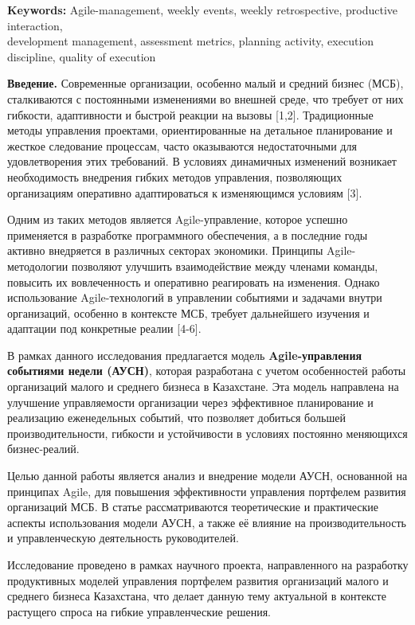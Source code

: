 {\bfseries Keywords:} Agile-management, weekly events, weekly
retrospective, productive interaction, \\development management,
assessment metrics, planning activity, execution discipline, quality of
execution
\begin{multicols}{2}

{\bfseries Введение.} Современные организации, особенно малый и средний
бизнес (МСБ), сталкиваются с постоянными изменениями во внешней среде,
что требует от них гибкости, адаптивности и быстрой реакции на вызовы
{[}1,2{]}. Традиционные методы управления проектами, ориентированные на
детальное планирование и жесткое следование процессам, часто оказываются
недостаточными для удовлетворения этих требований. В условиях динамичных
изменений возникает необходимость внедрения гибких методов управления,
позволяющих организациям оперативно адаптироваться к изменяющимся
условиям {[}3{]}.

Одним из таких методов является Agile-управление, которое успешно
применяется в разработке программного обеспечения, а в последние годы
активно внедряется в различных секторах экономики. Принципы
Agile-методологии позволяют улучшить взаимодействие между членами
команды, повысить их вовлеченность и оперативно реагировать на
изменения. Однако использование Agile-технологий в управлении событиями
и задачами внутри организаций, особенно в контексте МСБ, требует
дальнейшего изучения и адаптации под конкретные реалии {[}4-6{]}.

В рамках данного исследования предлагается модель
{\bfseries Agile-управления событиями недели (АУСН)}, которая разработана с
учетом особенностей работы организаций малого и среднего бизнеса в
Казахстане. Эта модель направлена на улучшение управляемости организации
через эффективное планирование и реализацию еженедельных событий, что
позволяет добиться большей производительности, гибкости и устойчивости в
условиях постоянно меняющихся бизнес-реалий.

Целью данной работы является анализ и внедрение модели АУСН, основанной
на принципах Agile, для повышения эффективности управления портфелем
развития организаций МСБ. В статье рассматриваются теоретические и
практические аспекты использования модели АУСН, а также её влияние на
производительность и управленческую деятельность руководителей.

Исследование проведено в рамках научного проекта, направленного на
разработку продуктивных моделей управления портфелем развития
организаций малого и среднего бизнеса Казахстана, что делает данную тему
актуальной в контексте растущего спроса на гибкие управленческие
решения.


\end{multicols}
